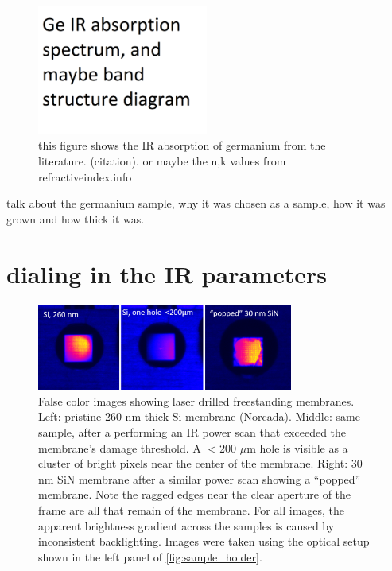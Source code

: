 \begin{figure}
	\centering
	\includegraphics[width=0.5\textwidth]{figures/chap3/Ge_IR_absorption.png}
	\caption{this figure shows the IR absorption of germanium from the literature. (citation). or maybe the n,k values from refractiveindex.info}
	\label{fig:Ge_IR_absorption}
\end{figure}

talk about the germanium sample, why it was chosen as a sample, how it was grown and how thick it was.



\section{dialing in the IR parameters}

\begin{figure}
	\centering
	\includegraphics[width=0.75\textwidth]{figures/chap3/sample_damage.png}
	\caption{False color images showing laser drilled freestanding membranes. Left: pristine 260 nm thick Si membrane (Norcada). Middle: same sample, after a performing an IR power scan that exceeded the membrane's damage threshold. A $<$200 $\mu$m hole is visible as a cluster of bright pixels near the center of the membrane. Right: 30 nm SiN membrane after a similar power scan showing a ``popped'' membrane. Note the ragged edges near the clear aperture of the frame are all that remain of the membrane. For all images, the apparent brightness gradient across the samples is caused by inconsistent backlighting. Images were taken using the optical setup shown in the left panel of \cref{fig:sample_holder}.}
	\label{fig:sample_damage}
\end{figure}

